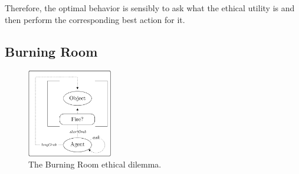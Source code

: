 \documentclass[11pt]{article}
\begin{document}
Therefore, the optimal behavior is sensibly to ask what the ethical utility is and then perform the corresponding best action for it.



\subsection{Burning Room}

\begin{figure}
\centering
\includegraphics[width=0.33\textwidth]{figures/burning_room.png}
\caption{The Burning Room ethical dilemma.}
\label{fig:burning_room}
\end{figure}
\end{document}
